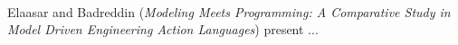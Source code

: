 

\ \hline \ %

Elaasar and Badreddin
\cite{isola-2016-elaasar}
({\em Modeling Meets Programming: A Comparative Study in
Model Driven Engineering Action Languages})
present ...

